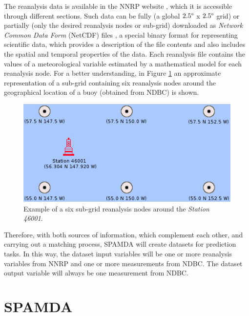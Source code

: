 \documentclass[energies,article,submit,moreauthors,pdftex]{Definitions/mdpi}
\begin{document}
\begin{itemize}[leftmargin=*,labelsep=5.8mm]
			The reanalysis data is available in the NNRP website \cite{NNRP}, which it is accessible through different sections. Such data can be fully (a global $2.5\degree$ x $2.5\degree$ grid) or partially (only the desired reanalysis nodes or sub-grid) downloaded as \textit{Network Common Data Form} (NetCDF) files \cite{NetCDF}, a special binary format for representing scientific data, which provides a description of the file contents and also includes the spatial and temporal properties of the data. Each reanalysis file contains the values of a meteorological variable estimated by a mathematical model for each reanalysis node. For a better understanding, in Figure \ref{fig:subGrid} an approximate representation of a sub-grid containing six reanalysis nodes around the geographical location of a buoy (obtained from NDBC) is shown.
			
			
			\begin{figure}[H]
				\centering
				\includegraphics[scale=0.52]{figures/FigureSubGrid.jpg}
				\caption{Example of a six sub-grid reanalysis nodes around the \textit{Station 46001}.}
				\label{fig:subGrid}
			\end{figure}
			
		\end{itemize}
		
		
		Therefore, with both sources of information, which complement each other, and carrying out a matching process, SPAMDA will create datasets for prediction tasks. In this way, the dataset input variables will be one or more reanalysis variables from NNRP and one or more measurements from NDBC. The dataset output variable will always be one measurement from NDBC.
		
	\section{SPAMDA}\label{sec:SPAMDA}
		
\end{document}
